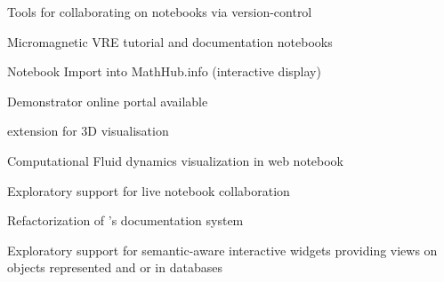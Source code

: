 \begin{workpackage}
\begin{wpdelivs}
  \begin{wpdeliv}[due=12,id=jupyter-collab,dissem=PU,nature=OTHER,lead=SR]
      {Tools for collaborating on notebooks via version-control}
  \end{wpdeliv}
    \begin{wpdeliv}[due=21,id=oommf-nb-documentation,dissem=PU,nature=DEM,lead=USO]
      {Micromagnetic VRE tutorial and documentation notebooks}
    \end{wpdeliv}
    \begin{wpdeliv}[id=jupyter-import,due=24,nature=DEM,dissem=PU,lead=JU]
      {Notebook Import into MathHub.info (interactive display)}
    \end{wpdeliv}
    \begin{wpdeliv}[due=24,id=oommf-nb-tmp,dissem=PU,nature=DEC,lead=USO]
      {Demonstrator online portal available}
    \end{wpdeliv}
  \begin{wpdeliv}[due=24,id=vis3d,dissem=PU,nature=OTHER,lead=SR]
      {\Jupyter extension for 3D visualisation}
  \end{wpdeliv}
  \begin{wpdeliv}[due=36,id=cfd-vis,dissem=PU,nature=OTHER,lead=SR]
      {Computational Fluid dynamics visualization in web notebook}
  \end{wpdeliv}
  \begin{wpdeliv}[due=36,id=jupyter-live-collab,dissem=PU,nature=OTHER,lead=SR]
      {Exploratory support for live notebook collaboration}
  \end{wpdeliv}
  \begin{wpdeliv}[due=24,id=sage-sphinx,dissem=PU,nature=OTHER,lead=PS]
      {Refactorization of \Sage's \Sphinx documentation system}
  \end{wpdeliv}
  \begin{wpdeliv}[due=36,id=ipython-advanced-interacts,dissem=PU,nature=DEM,lead=PS]
      {Exploratory support for semantic-aware interactive widgets providing views on objects
      represented and or in databases}
  \end{wpdeliv}



\end{wpdelivs}
\end{workpackage}
